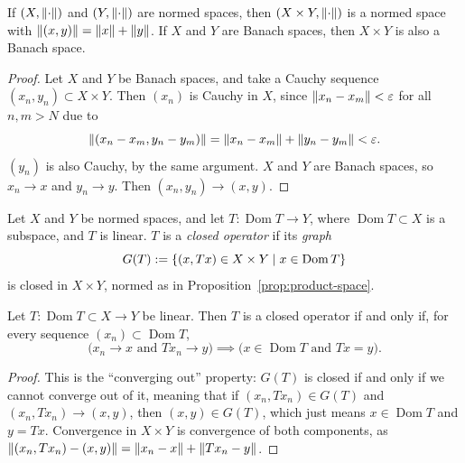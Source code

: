 \begin{proposition}\label{prop:product-space}
If $(X, \lVert\cdot\rVert)$ and $(Y, \lVert\cdot\rVert)$ are normed spaces, then
$(X \times Y, \lVert\cdot\rVert)$ is a normed space with
$\lVert(x,y)\rVert = \lVert x\rVert + \lVert y\rVert$. If $X$ and $Y$ are Banach spaces, then
$X \times Y$ is also a Banach space.
\end{proposition}

\begin{proof}
Let $X$ and $Y$ be Banach spaces, and take a Cauchy sequence
$(x_n, y_n) \subset X \times Y$. Then $(x_n)$ is Cauchy in $X$, since
$\lVert x_n - x_m\rVert < \varepsilon$ for all $n, m > N$ due to
\[
  \lVert(x_n - x_m, y_n - y_m)\rVert = \lVert x_n - x_m\rVert + \lVert y_n - y_m\rVert
  < \varepsilon .
\]
$(y_n)$ is also Cauchy, by the same argument. $X$ and $Y$ are Banach spaces,
so $x_n \to x$ and $y_n \to y$. Then $(x_n, y_n) \to (x, y)$.
\end{proof}

\begin{definition}\label{def:closed-operator}
Let $X$ and $Y$ be normed spaces, and let $T \colon \operatorname{Dom} T \to
Y$, where $\operatorname{Dom} T \subset X$ is a subspace, and $T$ is linear.
$T$ is a \emph{closed operator} if its \emph{graph}
\[
  G(T) := \{(x, Tx) \in X \times Y \mid x \in \operatorname{Dom} T\}
\]
is closed in $X \times Y$, normed as in Proposition~\ref{prop:product-space}.
\end{definition}

\begin{proposition}\label{prop:closed-sequential}
Let $T \colon \operatorname{Dom} T \subset X \to Y$ be linear. Then $T$ is a
closed operator if and only if, for every sequence
$(x_n) \subset \operatorname{Dom} T$,
\[
  \bigl(x_n \to x \text{ and } T x_n \to y\bigr) \implies
  \bigl(x \in \operatorname{Dom} T \text{ and } Tx = y\bigr) .
\]
\end{proposition}

\begin{proof}
This is the ``converging out'' property: $G(T)$ is closed if and only if we
cannot converge out of it, meaning that if $(x_n, T x_n) \in G(T)$ and
$(x_n, T x_n) \to (x, y)$, then $(x, y) \in G(T)$, which just means
$x \in \operatorname{Dom} T$ and $y = Tx$. Convergence in $X \times Y$ is
convergence of both components, as
$\lVert(x_n, T x_n) - (x, y)\rVert = \lVert x_n - x\rVert + \lVert T x_n - y\rVert$.
\end{proof}

